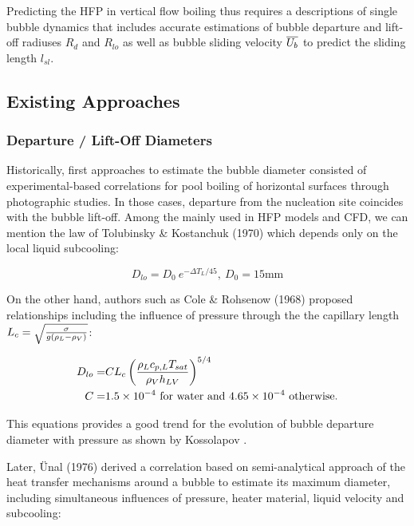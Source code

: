 \npar 

Predicting the HFP in vertical flow boiling thus requires a descriptions of single bubble dynamics that includes accurate estimations of bubble departure and lift-off radiuses $R_{d}$ and $R_{lo}$ as well as bubble sliding velocity $\overline{U_{b}}$ to predict the sliding length $l_{sl}$.

\subsection{Existing Approaches}

\subsubsection{Departure / Lift-Off Diameters}

Historically, first approaches to estimate the bubble diameter consisted of experimental-based correlations for pool boiling of horizontal surfaces through photographic studies. In those cases, departure from the nucleation site coincides with the bubble lift-off. Among the mainly used in HFP models and CFD, we can mention the law of Tolubinsky \& Kostanchuk (1970)\cite{tolubinsky_diam} which depends only on the local liquid subcooling:

\begin{equation}
D_{lo} = D_{0}~e^{-\Delta T_{L}/{45}},\ D_{0}=15\mathrm{mm}
\label{eq:dlo_tolubinsky}
\end{equation}

\npar
On the other hand, authors such as Cole \& Rohsenow (1968) proposed relationships including the influence of pressure through the the capillary length $L_{c}=\sqrt{\frac{\sigma}{g\left( \rho_{L}-\rho_{V} \right)}}$:

\begin{align}
D_{lo} =& C L_{c} \left( \frac{\rho_{L}c_{p,L}T_{sat}}{\rho_{V}h_{LV}} \right)^{5/4}
\label{eq:dlo_cole_rohsenow}
\\
\nonumber C=&1.5\times 10^{-4}\ \text{for water and }4.65\times 10^{-4}\ \text{otherwise}.
\end{align}

This equations provides a good trend for the evolution of bubble departure diameter with pressure as shown by Kossolapov \cite{kossolapov_experimental_2021}.

\npar

Later, \"Unal (1976)\cite{unal_maximum_1976} derived a correlation based on semi-analytical approach of the heat transfer mechanisms around a bubble to estimate its maximum diameter, including simultaneous influences of pressure, heater material, liquid velocity and subcooling:

